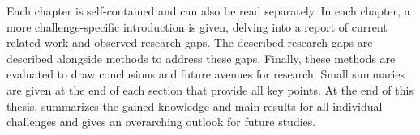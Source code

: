 Each chapter is self-contained and can also be read separately. In each chapter, a more challenge-specific introduction is given, delving into a report of current related work and observed research gaps. The described research gaps are described alongside methods to address these gaps. Finally, these methods are evaluated to draw conclusions and future avenues for research. Small summaries are given at the end of each section that provide all key points. At the end of this thesis,  summarizes the gained knowledge and main results for all individual challenges and gives an overarching outlook for future studies. 
